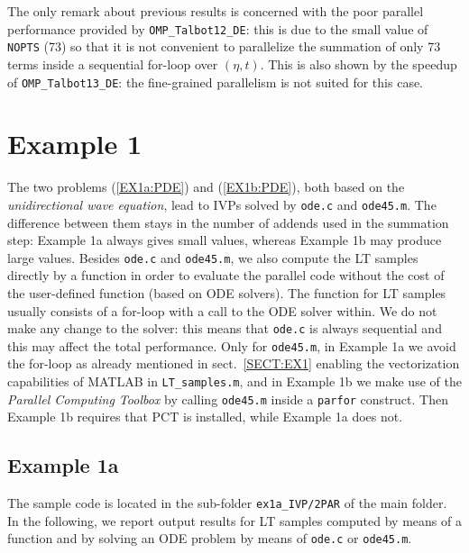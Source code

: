 \documentclass[a4paper,10pt]{report}%
\begin{document}
\noindent The only remark about previous results is concerned with the poor parallel performance provided by
{\tt OMP\_Talbot12\_DE}: this is due to the small value of {\tt NOPTS} (73) so that it is not convenient to
parallelize the summation of only 73 terms inside a sequential for-loop over $(\eta,t)$.
This is also shown by the speedup of {\tt OMP\_Talbot13\_DE}: the fine-grained parallelism is not suited for this
case.



\section{Example 1}
The two problems (\ref{EX1a:PDE}) and (\ref{EX1b:PDE}), both based on the {\em unidirectional wave equation}, lead to
IVPs solved by {\tt ode.c} and {\tt ode45.m}. The difference between them stays in the number of addends used in the
summation step: Example 1a always gives small values, whereas Example 1b may produce large values. Besides {\tt ode.c}
and {\tt ode45.m}, we also compute the LT samples directly by a function in order to evaluate the parallel code without
the cost of the user-defined function (based on ODE solvers). The function for LT samples usually consists of a
for-loop with a call to the ODE solver within. We do not make any change to the solver: this means that {\tt ode.c} is
always sequential and this may affect the total performance.
Only for {\tt ode45.m}, in Example 1a we avoid the for-loop as already mentioned in sect.~\ref{SECT:EX1} enabling the
vectorization capabilities of MATLAB in {\tt LT\_samples.m}, and in Example 1b we make use of the {\em Parallel Computing
Toolbox} by calling {\tt ode45.m} inside a {\tt parfor} construct. Then Example 1b requires that PCT is installed, while Example 1a does not.


\subsection{Example 1a} \label{PAR:1a}
The sample code is located in the sub-folder {\tt ex1a\_IVP/2PAR} of the main folder.
\\
In the following, we report output results for LT samples computed by means of a function and by solving an ODE
problem by means of {\tt ode.c} or {\tt ode45.m}.
\end{document}
